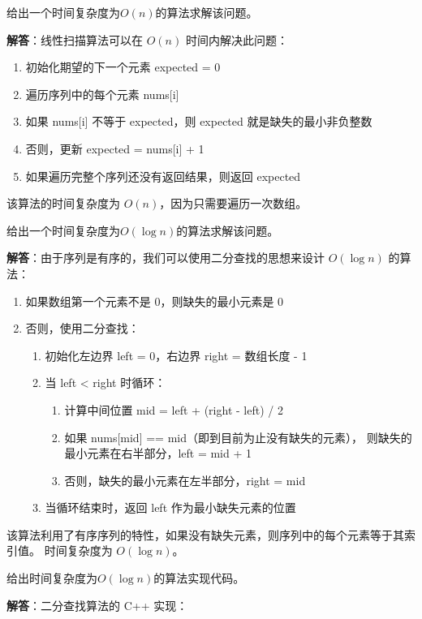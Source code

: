 \documentclass[12pt,twoside]{article}
\begin{document}
\begin{problems}
\bparts
\ppart 给出一个时间复杂度为$O(n)$的算法求解该问题。

\textbf{解答}：线性扫描算法可以在 $O(n)$ 时间内解决此问题：

\begin{enumerate}
\item 初始化期望的下一个元素 expected = 0
\item 遍历序列中的每个元素 nums[i]
\item 如果 nums[i] 不等于 expected，则 expected 就是缺失的最小非负整数
\item 否则，更新 expected = nums[i] + 1
\item 如果遍历完整个序列还没有返回结果，则返回 expected
\end{enumerate}

该算法的时间复杂度为 $O(n)$，因为只需要遍历一次数组。

\ppart 给出一个时间复杂度为$O(\log n)$的算法求解该问题。

\textbf{解答}：由于序列是有序的，我们可以使用二分查找的思想来设计 $O(\log n)$ 的算法：

\begin{enumerate}
\item 如果数组第一个元素不是 0，则缺失的最小元素是 0
\item 否则，使用二分查找：
   \begin{enumerate}
   \item 初始化左边界 left = 0，右边界 right = 数组长度 - 1
   \item 当 left < right 时循环：
      \begin{enumerate}
      \item 计算中间位置 mid = left + (right - left) / 2
      \item 如果 nums[mid] == mid（即到目前为止没有缺失的元素），
      则缺失的最小元素在右半部分，left = mid + 1
      \item 否则，缺失的最小元素在左半部分，right = mid
      \end{enumerate}
   \item 当循环结束时，返回 left 作为最小缺失元素的位置
   \end{enumerate}
\end{enumerate}

该算法利用了有序序列的特性，如果没有缺失元素，则序列中的每个元素等于其索引值。
时间复杂度为 $O(\log n)$。

\ppart 给出时间复杂度为$O(\log n)$的算法实现代码。

\textbf{解答}：二分查找算法的 C++ 实现：


\end{problems}
\end{document}
